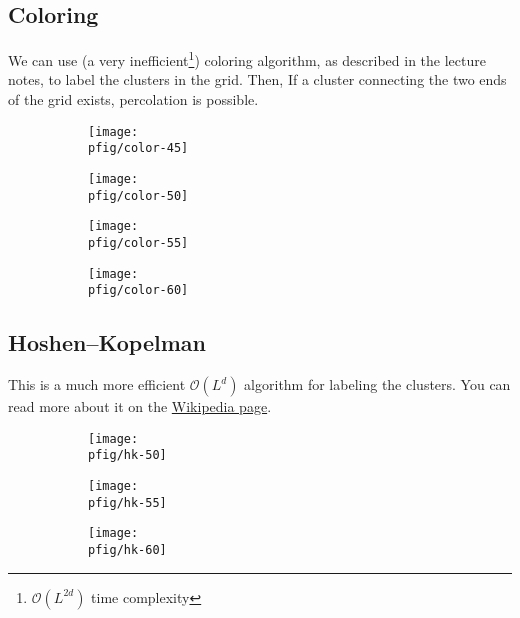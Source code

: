 \documentclass[12pt,a4paper]{article}
\newcommand{\pfig}{../fig/percolation}
\begin{document}
    \subsection{Coloring}
    We can use (a very inefficient\footnote{$\mathcal{O}(L^{2d})$ time complexity}) coloring algorithm, as described in
    the lecture notes, to label the clusters in the grid. Then, If a cluster connecting the two ends of the grid exists,
    percolation is possible.
    \begin{figure}
        \centering
        \begin{subfigure}{0.45\linewidth}
            \centering
            \texttt{[image: \\pfig/color-45]}
        \end{subfigure}
        \begin{subfigure}{0.45\linewidth}
            \centering
            \texttt{[image: \\pfig/color-50]}
        \end{subfigure}
        \begin{subfigure}{0.45\linewidth}
            \centering
            \texttt{[image: \\pfig/color-55]}
        \end{subfigure}
        \begin{subfigure}{0.45\linewidth}
            \centering
            \texttt{[image: \\pfig/color-60]}
        \end{subfigure}
    \end{figure}
    \subsection{Hoshen--Kopelman}
    This is a much more efficient $\mathcal{O}(L^d)$ algorithm for labeling the clusters. You can read more about it
    on the \href{https://en.wikipedia.org/wiki/Hoshen%E2%80%93Kopelman_algorithm}{Wikipedia page}.
    \thispagestyle{empty}
    \begin{figure}
        \centering
        \begin{subfigure}{\linewidth}
            \centering
            \texttt{[image: \\pfig/hk-50]}
        \end{subfigure}
        \begin{subfigure}{\linewidth}
            \centering
            \texttt{[image: \\pfig/hk-55]}
        \end{subfigure}
        \begin{subfigure}{\linewidth}
            \centering
            \texttt{[image: \\pfig/hk-60]}
        \end{subfigure}
    \end{figure}
    \restoregeometry
\end{document}
